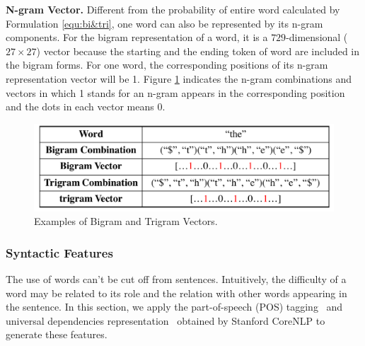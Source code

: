 \textbf{N-gram Vector.} 
Different from the probability of entire word calculated by Formulation \ref{equ:bi&tri}, one word can also be represented by its n-gram components.
For the bigram representation of a word, it is a $729$-dimensional ($27\times 27$) vector because the starting and the ending token of word are included in the bigram forms.
For one word, the corresponding positions of its n-gram representation vector will be 1.
Figure \ref{fig:bitri} indicates the n-gram combinations and vectors in which 1 stands for an n-gram appears in the corresponding position and the dots in each vector means 0.
\begin{figure}[th]
	\centering
	\includegraphics[width=1\linewidth]{pic/bitri.pdf}  
	\caption{Examples of Bigram and Trigram Vectors.}
	\label{fig:bitri}
\end{figure}
\vspace{-0.5cm}
\subsubsection{Syntactic Features}
The use of words can't be cut off from sentences. 
Intuitively, the difficulty of a word may be related to its role 
and the relation with other words appearing in the sentence.
In this section, we apply the part-of-speech (POS) tagging~\cite{toutanova2003feature} and universal dependencies representation~\cite{schuster2016enhanced} obtained by Stanford CoreNLP to generate these features. 

